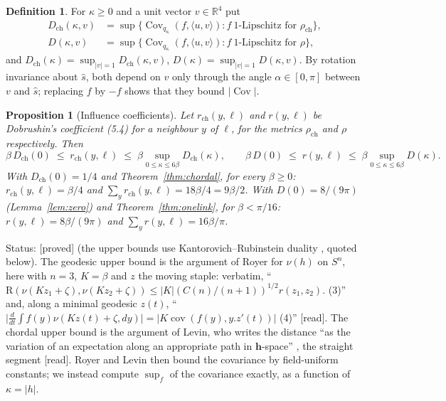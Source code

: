 \documentclass[11pt,a4paper]{article}
\newtheorem{proposition}[theorem]{Proposition}
\theoremstyle{remark}
\theoremstyle{definition}
\newtheorem{definition}[theorem]{Definition}
\theoremstyle{plain}
\theoremstyle{remark}
\newcommand{\R}{\mathbb{R}}
\newcommand{\Cov}{\operatorname{Cov}}
\newcommand{\st}[1]{\textsf{[#1]}}
\newcommand{\Dch}{D_{\mathrm{ch}}}
\newcommand{\rch}{\rho_{\mathrm{ch}}}
\begin{document}
\begin{definition}\label{def:D}
For $\kappa\ge0$ and a unit vector $v\in\R^4$ put
\begin{align*}
\Dch(\kappa,v)&=\sup\{\Cov_{q_\kappa}(f,\langle u,v\rangle): f\ \text{1-Lipschitz for }\rch\},\\
D(\kappa,v)&=\sup\{\Cov_{q_\kappa}(f,\langle u,v\rangle): f\ \text{1-Lipschitz for }\rho\},
\end{align*}
and $\Dch(\kappa)=\sup_{|v|=1}\Dch(\kappa,v)$, $D(\kappa)=\sup_{|v|=1}D(\kappa,v)$.
By rotation invariance about $\hat s$, both depend on $v$ only through the angle $\alpha\in[0,\pi]$ between
$v$ and $\hat s$; replacing $f$ by $-f$ shows that they bound $|\Cov|$.
\end{definition}

\begin{proposition}[Influence coefficients]\label{prop:influence}
Let $r_{\mathrm{ch}}(y,\ell)$ and $r(y,\ell)$ be Dobrushin's coefficient (5.4) for a neighbour $y$ of $\ell$, for the
metrics $\rch$ and $\rho$ respectively. Then
\[
  \beta\,\Dch(0)\;\le\;r_{\mathrm{ch}}(y,\ell)\;\le\;\beta\sup_{0\le\kappa\le6\beta}\Dch(\kappa),\qquad
  \beta\,D(0)\;\le\;r(y,\ell)\;\le\;\beta\sup_{0\le\kappa\le6\beta}D(\kappa).
\]
With $\Dch(0)=1/4$ and Theorem~\ref{thm:chordal}, for every $\beta\ge0$: $r_{\mathrm{ch}}(y,\ell)=\beta/4$ and
$\sum_y r_{\mathrm{ch}}(y,\ell)=18\beta/4=9\beta/2$. With $D(0)=8/(9\pi)$ (Lemma~\ref{lem:zero}) and
Theorem~\ref{thm:onelink}, for $\beta<\pi/16$: $r(y,\ell)=8\beta/(9\pi)$ and $\sum_y r(y,\ell)=16\beta/\pi$.
\end{proposition}
\noindent Status: \st{proved} (the upper bounds use Kantorovich--Rubinstein duality \cite[Thm~10.8]{DS25},
quoted below). The geodesic upper bound is the argument of Royer \cite[(3)--(4), p.~31]{Roy86} for $\nu(h)$ on $S^n$,
here with $n=3$, $K=\beta$ and $z$ the moving staple: verbatim, ``$\mathrm R(\nu(Kz_1+\zeta),\nu(Kz_2+\zeta))
\leqslant|K|(C(n)/(n+1))^{1/2}r(z_1,z_2)$. (3)'' and, along a minimal geodesic $z(t)$,
``$\big|\frac{d}{dt}\int f(y)\nu(Kz(t)+\zeta,dy)\big|=|K\operatorname{cov}(f(y),y.z'(t))|$ (4)'' \st{read}.
The chordal upper bound is the argument of Levin, who writes the distance ``as the variation of an expectation
along an appropriate path in $\mathbf h$-space'' \cite[p.~68]{Lev80}, the straight segment
\cite[(3.35), p.~71]{Lev80} \st{read}.
Royer and Levin then bound the covariance by field-uniform constants; we instead compute $\sup_f$ of the
covariance exactly, as a function of $\kappa=|h|$.
\end{document}
